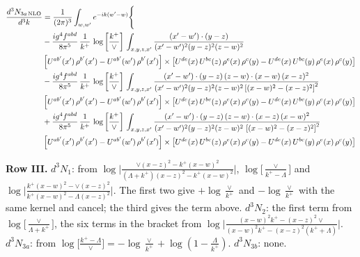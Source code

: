 \documentclass[9pt]{article}
\numberwithin{equation}{section}
\begin{document}
\begin{align}
\frac{d^{3}N_{3a\,\rm NLO}}{d^{3}k} & =\frac{1}{(2\pi)^{3}}\int_{w,w'}e^{-ik(w'-w)}\Bigg\{\notag \\ &  -\frac{ig^{4}f^{abd}}{8\pi^{5}}\,\frac{1}{k^{+}}\, \log{\left[\frac{k^{+}}{\vee}\right]}\,\int_{x,y,z,x'}
\frac{(x'-w')\cdot(y-z)}{(x'-w')^{2}(y-z)^{2}(z-w)^{2}}\notag \\ & \left[U^{ab'}(x')\,\rho^{b'}(x')-U^{ab'}(w')\, \rho^{b'}(x')\right]\times \left[U^{de}(x)\,U^{bc}(z)\, \rho^{e}(x)\,\rho^{c}(y)-U^{de}(x)\,U^{bc}(y)\,\rho^{e}(x)\,\rho^{c}(y)\right]\notag \\ & -\frac{ig^{4}f^{abd}}{8\pi^{5}}\,\frac{1}{k^{+}}\, \log{\left[\frac{k^{+}}{\vee}\right]}\,\int_{x,y,z,x'}
\frac{(x'-w')\cdot(y-z)\,(z-w)\cdot(x-w)\,(x-z)^{2}}{(x'-w')^{2}(y-z)^{2}(z-w)^{2}\left[(x-w)^{2}-(x-z)^{2}\right]^{2}}\notag \\ & \left[U^{ab'}(x')\,\rho^{b'}(x')-U^{ab'}(w')\, \rho^{b'}(x')\right]\times \left[U^{de}(x)\,U^{bc}(z)\, \rho^{e}(x)\,\rho^{c}(y)-U^{de}(x)\,U^{bc}(y)\,\rho^{e}(x)\,\rho^{c}(y)\right]\notag \\ & +\frac{ig^{4}f^{abd}}{8\pi^{5}}\,\frac{1}{k^{+}}\, \log{\left[\frac{k^{+}}{\vee}\right]}\,\int_{x,y,z,x'}
\frac{(x'-w')\cdot(y-z)\,(z-w)\cdot(x-z)\,(x-w)^{2}}{(x'-w')^{2}(y-z)^{2}(z-w)^{2}\,\left[(x-w)^{2}-(x-z)^{2}\right]^{2}}\notag \\ & \left[U^{ab'}(x')\,\rho^{b'}(x')-U^{ab'}(w')\, \rho^{b'}(x')\right]\times \left[U^{de}(x)\,U^{bc}(z)\, \rho^{e}(x)\,\rho^{c}(y)-U^{de}(x)\,U^{bc}(y)\,\rho^{e}(x)\,\rho^{c}(y)\right]
\end{align}

\textbf{Row III.} $d^3N_1$: from $\log\Big|\frac{\vee(x-z)^{2}-k^{+}(x-w)^{2}}{(\Lambda+k^{+})(x-z)^{2}-k^{+}(x-w)^{2}}\Big|$, $\log\big[\frac{\vee}{k^+-\Lambda}\big]$ and $\log\Big|\frac{k^{+}(x-w)^{2}-\vee(x-z)^{2}}{k^{+}(x-w)^{2}-\Lambda(x-z)^{2}}\Big|$. The first two give $+\log\frac{\vee}{k^+}$ and $-\log\frac{\vee}{k^+}$ with the same kernel and cancel; the third gives the term above. $d^3N_2$: the first term from $\log\big[\frac{\vee}{\Lambda+k^+}\big]$, the six terms in the bracket from $\log\Big|\frac{(x-w)^{2}k^{+}-(x-z)^{2}\vee}{(x-w)^{2}k^{+}-(x-z)^{2}(k^{+}+\Lambda)}\Big|$. $d^3N_{3a}$: from $\log\big[\frac{k^+-\Lambda}{\vee}\big]=-\log\frac{\vee}{k^+}+\log(1-\frac{\Lambda}{k^+})$. $d^3N_{3b}$: none.
\end{document}
